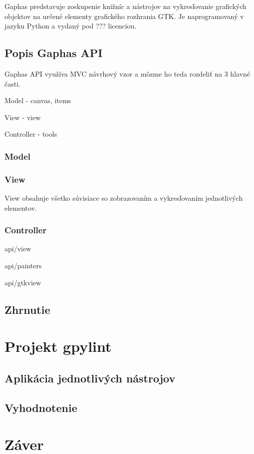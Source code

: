 \documentclass[11pt,oneside,final]{fithesis2}
\begin{document}
		Gaphas predstavuje zoskupenie knižníc a nástrojov na vykresľovanie grafických objektov na určené elementy grafického rozhrania GTK. Je naprogramovaný v jazyku Python a vydaný pod ??? licenciou.

	\section{Popis Gaphas API}

Gaphas API využíva MVC návrhový vzor a môzme ho teda rozdeliť na 3 hlavné časti.
\begin{list}{•}{}
\item Model - canvas, items
\item View - view
\item Controller - tools
\end{list}

\subsection{Model}

    
\subsection{View}
View obsahuje všetko súvisiace so zobrazovaním a vykresľovaním jednotlivých elementov.

\subsection{Controller}

\begin{list}{•}{}
\item api/view
\item api/painters
\item api/gtkview
\end{list}
    
\section{Zhrnutie}    
    
\chapter{Projekt gpylint}
	\section{Aplikácia jednotlivých nástrojov}
	\section{Vyhodnotenie}	

\chapter{Záver}
\end{document}
